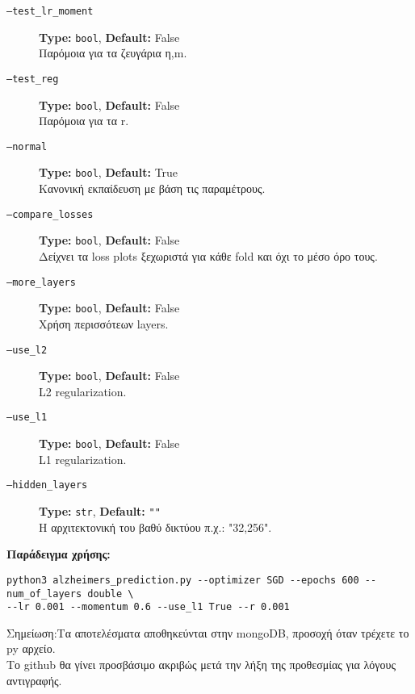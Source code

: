 \documentclass[a4paper,11pt]{article}
\begin{document}
\begin{description}
    \item[\texttt{--test\_lr\_moment}] \textbf{Type:} \texttt{bool}, \textbf{Default:} False\\
    Παρόμοια για τα ζευγάρια η,m.
  
    \item[\texttt{--test\_reg}] \textbf{Type:} \texttt{bool}, \textbf{Default:} False\\
    Παρόμοια για τα r.
  
    \item[\texttt{--normal}] \textbf{Type:} \texttt{bool}, \textbf{Default:} True\\
    Κανονική εκπαίδευση με βάση τις παραμέτρους.
  
    \item[\texttt{--compare\_losses}] \textbf{Type:} \texttt{bool}, \textbf{Default:} False\\
    Δείχνει τα loss plots ξεχωριστά για κάθε fold και όχι το μέσο όρο τους.
  
    \item[\texttt{--more\_layers}] \textbf{Type:} \texttt{bool}, \textbf{Default:} False\\
    Χρήση περισσότεων layers.
  
    \item[\texttt{--use\_l2}] \textbf{Type:} \texttt{bool}, \textbf{Default:} False\\
    L2 regularization.
  
    \item[\texttt{--use\_l1}] \textbf{Type:} \texttt{bool}, \textbf{Default:} False\\
    L1 regularization.
  
    \item[\texttt{--hidden\_layers}] \textbf{Type:} \texttt{str}, \textbf{Default:} \texttt{""}\\
    Η αρχιτεκτονική του βαθύ δικτύου π.χ.: "32,256".
  \end{description}

  \textbf{Παράδειγμα χρήσης:}
  \begin{verbatim}
python3 alzheimers_prediction.py --optimizer SGD --epochs 600 --num_of_layers double \
--lr 0.001 --momentum 0.6 --use_l1 True --r 0.001 
    \end{verbatim}
  
Σημείωση:Τα αποτελέσματα αποθηκεύνται στην mongoDB, προσοχή όταν τρέχετε το py αρχείο.\\
Το github θα γίνει προσβάσιμο ακριβώς μετά την λήξη της προθεσμίας για λόγους αντιγραφής.
\end{document}
